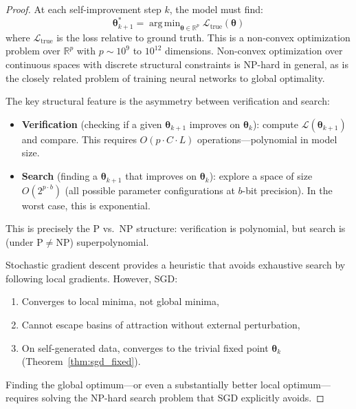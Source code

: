 \documentclass[11pt,a4paper]{article}
\DeclareMathOperator*{\argmin}{arg\,min}
\begin{document}
\begin{proof}
At each self-improvement step $k$, the model must find:
\begin{equation}
\bm{\theta}_{k+1}^* = \argmin_{\bm{\theta} \in \mathbb{R}^p} \mathcal{L}_{\mathrm{true}}(\bm{\theta})
\end{equation}
where $\mathcal{L}_{\mathrm{true}}$ is the loss relative to ground truth. This is a non-convex optimization problem over $\mathbb{R}^p$ with $p \sim 10^{9}$ to $10^{12}$ dimensions. Non-convex optimization over continuous spaces with discrete structural constraints is NP-hard in general, as is the closely related problem of training neural networks to global optimality.

The key structural feature is the asymmetry between verification and search:
\begin{itemize}
    \item \textbf{Verification} (checking if a given $\bm{\theta}_{k+1}$ improves on $\bm{\theta}_k$): compute $\mathcal{L}(\bm{\theta}_{k+1})$ and compare. This requires $O(p \cdot C \cdot L)$ operations---polynomial in model size.
    \item \textbf{Search} (finding a $\bm{\theta}_{k+1}$ that improves on $\bm{\theta}_k$): explore a space of size $O(2^{p \cdot b})$ (all possible parameter configurations at $b$-bit precision). In the worst case, this is exponential.
\end{itemize}
This is precisely the $\mathrm{P}$ vs.\ $\mathrm{NP}$ structure: verification is polynomial, but search is (under $\mathrm{P} \neq \mathrm{NP}$) superpolynomial.

Stochastic gradient descent provides a heuristic that avoids exhaustive search by following local gradients. However, SGD:
\begin{enumerate}
    \item Converges to local minima, not global minima,
    \item Cannot escape basins of attraction without external perturbation,
    \item On self-generated data, converges to the trivial fixed point $\bm{\theta}_k$ (Theorem~\ref{thm:sgd_fixed}).
\end{enumerate}
Finding the global optimum---or even a substantially better local optimum---requires solving the NP-hard search problem that SGD explicitly avoids.
\end{proof}
\end{document}
